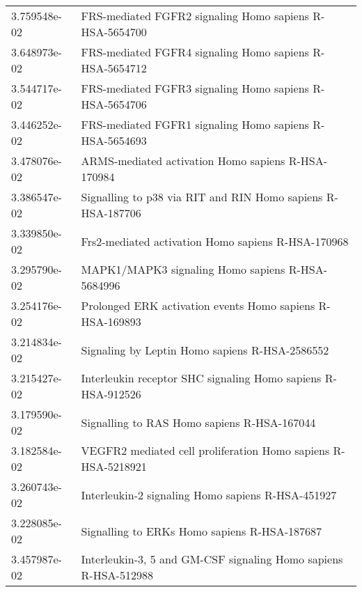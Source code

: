 \begin{longtable}{p{2.4cm}p{14.5cm}}
             3.759548e-02 &                                       FRS-mediated FGFR2 signaling Homo sapiens R-HSA-5654700 \\
             3.648973e-02 &                                       FRS-mediated FGFR4 signaling Homo sapiens R-HSA-5654712 \\
             3.544717e-02 &                                       FRS-mediated FGFR3 signaling Homo sapiens R-HSA-5654706 \\
             3.446252e-02 &                                       FRS-mediated FGFR1 signaling Homo sapiens R-HSA-5654693 \\
             3.478076e-02 &                                            ARMS-mediated activation Homo sapiens R-HSA-170984 \\
             3.386547e-02 &                                   Signalling to p38 via RIT and RIN Homo sapiens R-HSA-187706 \\
             3.339850e-02 &                                            Frs2-mediated activation Homo sapiens R-HSA-170968 \\
             3.295790e-02 &                                              MAPK1/MAPK3 signaling Homo sapiens R-HSA-5684996 \\
             3.254176e-02 &                                     Prolonged ERK activation events Homo sapiens R-HSA-169893 \\
             3.214834e-02 &                                                Signaling by Leptin Homo sapiens R-HSA-2586552 \\
             3.215427e-02 &                                  Interleukin receptor SHC signaling Homo sapiens R-HSA-912526 \\
             3.179590e-02 &                                                   Signalling to RAS Homo sapiens R-HSA-167044 \\
             3.182584e-02 &                                 VEGFR2 mediated cell proliferation Homo sapiens R-HSA-5218921 \\
             3.260743e-02 &                                             Interleukin-2 signaling Homo sapiens R-HSA-451927 \\
             3.228085e-02 &                                                  Signalling to ERKs Homo sapiens R-HSA-187687 \\
             3.457987e-02 &                               Interleukin-3, 5 and GM-CSF signaling Homo sapiens R-HSA-512988 \\

\end{longtable}
